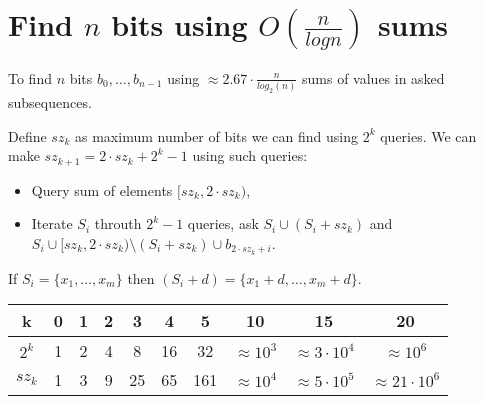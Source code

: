 \section*{Find $n$ bits using $O(\frac{n}{logn})$ sums}
To find $n$ bits $b_0, \dots, b_{n - 1}$ using $\approx 2.67 \cdot \frac{n}{log_2(n)}$ sums of values in asked subsequences.

Define $sz_k$ as maximum number of bits we can find using $2^k$ queries.
We can make $sz_{k + 1} = 2 \cdot sz_k + 2^k - 1$ using such queries:

\begin{itemize}
\item Query sum of elements $[sz_k, 2 \cdot sz_k)$,
\item Iterate $S_i$ throuth $2^k - 1$ queries, ask $S_i \cup (S_i + sz_k)$ and $S_i \cup [sz_k, 2 \cdot sz_k) \setminus (S_i + sz_k) \cup b_{2 \cdot sz_k + i}$.    
\end{itemize}

If $S_i = \{x_1, \dots, x_m\}$ then $(S_i + d) = \{x_1 + d, \dots, x_m + d \}$.

\begin{tabular}{|c|c|c|c|c|c|c|c|c|c|}
\hline
k 		& 0 & 1 & 2 & 3  & 4  & 5   & 10     		 & 15 					  & 20 \\
\hline
$2^k$ 	& 1 & 2 & 4 & 8  & 16 & 32  & $\approx 10^3$ & $\approx 3 \cdot 10^4$ & $\approx 10^6$ \\
\hline
$sz_k$ 	& 1 & 3 & 9 & 25 & 65 & 161 & $\approx 10^4$ & $\approx 5 \cdot 10^5$ & $\approx 21 \cdot 10^6$\\
\hline
\end{tabular}
